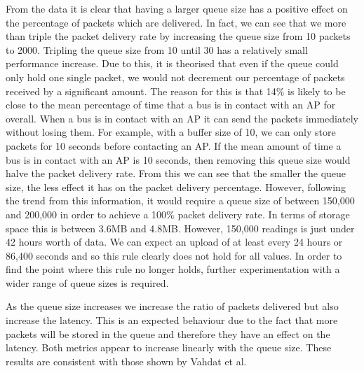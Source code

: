         From the data it is clear that having a larger queue size has a positive effect on the percentage of packets which are delivered. In fact, we can see that we more than triple the packet delivery rate by increasing the queue size from 10 packets to 2000. Tripling the queue size from 10 until 30 has a relatively small performance increase. Due to this, it is theorised that even if the queue could only hold one single packet, we would not decrement our percentage of packets received by a significant amount. The reason for this is that 14\% is likely to be close to the mean percentage of time that a bus is in contact with an AP for overall. When a bus is in contact with an AP it can send the packets immediately without losing them. For example, with a buffer size of 10, we can only store packets for 10 seconds before contacting an AP. If the mean amount of time a bus is in contact with an AP is 10 seconds, then removing this queue size would halve the packet delivery rate. From this we can see that the smaller the queue size, the less effect it has on the packet delivery percentage. However, following the trend from this information, it would require a queue size of between 150,000 and 200,000 in order to achieve a 100\% packet delivery rate. In terms of storage space this is between 3.6MB and 4.8MB. However, 150,000 readings is just under 42 hours worth of data. We can expect an upload of at least every 24 hours or 86,400 seconds and so this rule clearly does not hold for all values. In order to find the point where this rule no longer holds, further experimentation with a wider range of queue sizes is required.

        As the queue size increases we increase the ratio of packets delivered but also increase the latency. This is an expected behaviour due to the fact that more packets will be stored in the queue and therefore they have an effect on the latency. Both metrics appear to increase linearly with the queue size. These results are consistent with those shown by Vahdat et al.~\cite{vahdat2000epidemic}

